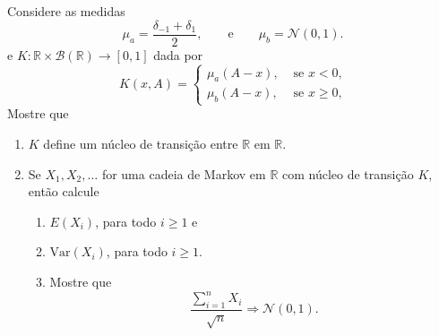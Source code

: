 \documentclass[../Notas_de_aula.tex]{subfiles}
\begin{document}
\begin{exercise}
  Considere as medidas
  \begin{equation}
    \mu_a = \frac{\delta_{-1} + \delta_1}{2}, \qquad \text{e} \qquad \mu_b = \mathcal{N}(0, 1).
  \end{equation}
  e $K:\mathbb{R} \times \mathcal{B}(\mathbb{R}) \to [0,1]$ dada por
  \begin{equation}
    K(x, A) =
    \begin{cases}
      \mu_a (A - x), & \text{ se $x < 0$,}\\
      \mu_b (A - x), & \text{ se $x \geq 0$,}
    \end{cases}
  \end{equation}
  Mostre que
  \begin{enumerate}[\quad a)]
  \item $K$ define um núcleo de transição entre $\mathbb{R}$ em $\mathbb{R}$.
  \item Se $X_1, X_2, \dots$ for uma cadeia de Markov em $\mathbb{R}$ com núcleo de transição $K$, então calcule
    \begin{enumerate}[\qquad i)]
    \item $E(X_i)$, para todo $i \geq 1$ e
    \item $\text{Var}(X_i)$, para todo $i \geq 1$.
    \item Mostre que
      \begin{equation}
        \frac{\sum_{i = 1}^n X_i}{\sqrt{n}} \Rightarrow \mathcal{N}(0,1).
      \end{equation}
    \end{enumerate}
  \end{enumerate}
\end{exercise}
\end{document}
